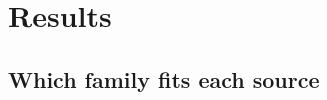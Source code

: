 
\section{Results}
\label{sec:results}


\subsection{Which family fits each source}
\label{sec:results:overview}

